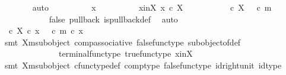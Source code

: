 \begin{isabellebody}
\ \ \ \ \ \ \isamarkupfalse%
\ auto\isanewline
\ \ \ \ \ \ \ \ \isamarkupfalse%
\ x\isanewline
\ \ \ \ \ \ \ \ \isamarkupfalse%
\ x{\isacharunderscore}{\kern0pt}in{\isacharunderscore}{\kern0pt}X{\isacharcolon}{\kern0pt}\ {\isachardoublequoteopen}x\ {\isasymin}\isactrlsub c\ X{\isachardoublequoteclose}\isanewline
\ \ \ \ \ \ \ \ \isamarkupfalse%
\ {\isachardoublequoteopen}{\isasymt}\ {\isasymcirc}\isactrlsub c\ {\isasymbeta}\isactrlbsub X\isactrlesub \ {\isacharequal}{\kern0pt}\ {\isasymf}\ {\isasymcirc}\isactrlsub c\ m{\isachardoublequoteclose}\isanewline
\ \ \ \ \ \ \ \ \ \ \isamarkupfalse%
\ {\isasymchi}{\isacharunderscore}{\kern0pt}false\ {\isasymchi}{\isacharunderscore}{\kern0pt}pullback\ is{\isacharunderscore}{\kern0pt}pullback{\isacharunderscore}{\kern0pt}def\ \isamarkupfalse%
\ auto\isanewline
\ \ \ \ \ \ \ \ \isamarkupfalse%
\ \isamarkupfalse%
\ {\isachardoublequoteopen}{\isasymt}\ {\isasymcirc}\isactrlsub c\ {\isacharparenleft}{\kern0pt}{\isasymbeta}\isactrlbsub X\isactrlesub \ {\isasymcirc}\isactrlsub c\ x{\isacharparenright}{\kern0pt}\ {\isacharequal}{\kern0pt}\ {\isasymf}\ {\isasymcirc}\isactrlsub c\ {\isacharparenleft}{\kern0pt}m\ {\isasymcirc}\isactrlsub c\ x{\isacharparenright}{\kern0pt}{\isachardoublequoteclose}\isanewline
\ \ \ \ \ \ \ \ \ \ \isamarkupfalse%
\ {\isacharparenleft}{\kern0pt}smt\ X{\isacharunderscore}{\kern0pt}m{\isacharunderscore}{\kern0pt}subobject\ comp{\isacharunderscore}{\kern0pt}associative{}\ false{\isacharunderscore}{\kern0pt}func{\isacharunderscore}{\kern0pt}type\ subobject{\isacharunderscore}{\kern0pt}of{\isacharunderscore}{\kern0pt}def{}\isanewline
\ \ \ \ \ \ \ \ \ \ \ \ \ \ terminal{\isacharunderscore}{\kern0pt}func{\isacharunderscore}{\kern0pt}type\ true{\isacharunderscore}{\kern0pt}func{\isacharunderscore}{\kern0pt}type\ x{\isacharunderscore}{\kern0pt}in{\isacharunderscore}{\kern0pt}X{\isacharparenright}{\kern0pt}\isanewline
\ \ \ \ \ \ \ \ \isamarkupfalse%
\ \isamarkupfalse%
\ {\isachardoublequoteopen}{\isasymt}\ {\isacharequal}{\kern0pt}\ {\isasymf}{\isachardoublequoteclose}\isanewline
\ \ \ \ \ \ \ \ \ \ \isamarkupfalse%
\ {\isacharparenleft}{\kern0pt}smt\ X{\isacharunderscore}{\kern0pt}m{\isacharunderscore}{\kern0pt}subobject\ cfunc{\isacharunderscore}{\kern0pt}type{\isacharunderscore}{\kern0pt}def\ comp{\isacharunderscore}{\kern0pt}type\ false{\isacharunderscore}{\kern0pt}func{\isacharunderscore}{\kern0pt}type\ id{\isacharunderscore}{\kern0pt}right{\isacharunderscore}{\kern0pt}unit\ id{\isacharunderscore}{\kern0pt}type\isanewline

\end{isabellebody}
